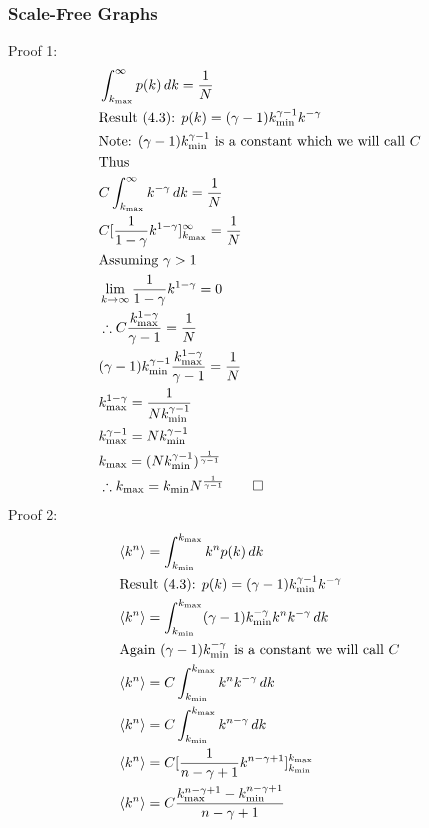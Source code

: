 \documentclass{article}
\begin{document}
            \subsubsection{Scale-Free Graphs}
            Proof 1:
            \begin{align*}
                &\int_{k_{\text{max}}}^{\infty} p(k) \,dk = \frac{1}{N}\\
                &\text{Result (4.3): } p(k) = (\gamma -1)k^{\gamma-1}_{\text{min}}k^{-\gamma}\\
                &\text{Note: $(\gamma -1)k^{\gamma-1}_{\text{min}}$ is a constant which we will call $C$}\\
                &\text{Thus}\\
                &C\int_{k_{\text{max}}}^{\infty}k^{-\gamma} \,dk  = \frac{1}{N}\\
                &C[\frac{1}{1-\gamma}k^{1-\gamma}]^{\infty}_{k_{\text{max}}} = \frac{1}{N}\\
                &\text{Assuming $\gamma>1$}\\
                &\lim_{k \to \infty} \frac{1}{1-\gamma}k^{1-\gamma}= 0\\
                &\therefore C\frac{{k^{1-\gamma}_{\text{max}}}}{\gamma -1} = \frac{1}{N}\\
                &(\gamma-1)k^{\gamma-1}_{\text{min}}\frac{{k^{1-\gamma}_{\text{max}}}}{\gamma -1} = \frac{1}{N}\\
                &k^{1-\gamma}_{\text{max}} = \frac{1}{Nk^{\gamma-1}_{\text{min}}}\\
                &k^{\gamma -1}_{\text{max}} = Nk^{\gamma-1}_{\text{min}}\\
                &k_{\text{max}} = (Nk^{\gamma-1}_{\text{min}})^{\frac{1}{\gamma-1}}\\
                &\therefore k_{\text{max}} = k_{\text{min}}N^{\frac{1}{\gamma-1}} \qed
            \end{align*}
            Proof 2:
            \begin{align*}
                &\langle k^n \rangle = \int_{k_{\text{min}}}^{k_{\text{max}}}k^{n}p(k) \,dk\\
                &\text{Result (4.3): } p(k) = (\gamma -1)k^{\gamma-1}_{\text{min}}k^{-\gamma}\\
                &\langle k^n \rangle = \int_{k_{\text{min}}}^{k_{\text{max}}} (\gamma-1)k^{-\gamma}_{\text{min}}k^{n}k^{-\gamma} \,dk \\
                &\text{Again $ (\gamma-1)k^{-\gamma}_{\text{min}}$ is a constant we will call $C$}\\
                &\langle k^n \rangle = C\int_{k_{\text{min}}}^{k_{\text{max}}}k^{n}k^{-\gamma} \,dk\\ 
                &\langle k^n \rangle = C\int_{k_{\text{min}}}^{k_{\text{max}}}k^{n-\gamma} \,dk\\
                &\langle k^n \rangle = C[\frac{1}{n-\gamma +1}k^{n-\gamma+1}]^{k_{\text{max}}}_{k_{\text{min}}}\\
                &\langle k^n \rangle = C\frac{k_{\text{max}}^{n-\gamma+1} -k_{\text{min}}^{n-\gamma+1}}{n-\gamma +1 }
            \end{align*}
\end{document}
